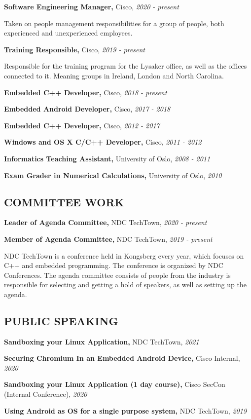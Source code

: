 \documentclass{article}
\newcommand\CVEntry[3]{
  {\bf #1,} #2, {\it #3}
}
\newcommand\CVComment[4]{
  \CVEntry{#1}{#2}{#3}

  #4
}
\begin{document}
\begin{addmargin}[2em]{0em}
  \CVComment{Software Engineering Manager}{Cisco}{2020 - present}{
    Taken on people management responsibilities for a group of people, both experienced and 
    unexperienced employees.}

  \CVComment{Training Responsible}{Cisco}{2019 - present}{
    Responsible for the training program for the Lysaker office, as well as the offices connected to
    it. Meaning groups in Ireland, London and North Carolina.}

  \CVEntry{Embedded C++ Developer}{Cisco}{2018 - present}

  \CVEntry{Embedded Android Developer}{Cisco}{2017 - 2018}

  \CVEntry{Embedded C++ Developer}{Cisco}{2012 - 2017}

  \CVEntry{Windows and OS X C/C++ Developer}{Cisco}{2011 - 2012}

  \CVEntry{Informatics Teaching Assistant}{University of Oslo}{2008 - 2011}

  \CVEntry{Exam Grader in Numerical Calculations}{University of Oslo}{2010}

\end{addmargin}

\subsection*{COMMITTEE WORK}

\begin{addmargin}[2em]{0em}
  \CVEntry{Leader of Agenda Committee}{NDC TechTown}{2020 - present}

  \CVComment{Member of Agenda Committee}{NDC TechTown}{2019 - present}{
    NDC TechTown is a conference held in Kongsberg every year, which focuses on C++
    and embedded programming. The conference is organized by NDC Conferences. The
    agenda committee consists of people from the industry is responsible for
    selecting and getting a hold of speakers, as well as setting up the agenda.}

\end{addmargin}

\subsection*{PUBLIC SPEAKING}

\begin{addmargin}[2em]{0em}
  \CVEntry{Sandboxing your Linux Application}{NDC TechTown}{2021}

  \CVEntry{Securing Chromium In an Embedded Android Device}{Cisco Internal}{2020}

  \CVEntry{Sandboxing your Linux Application (1 day course)}{Cisco SecCon (Internal Conference)}{2020}

  \CVEntry{Using Android as OS for a single purpose system}{NDC TechTown}{2019}
\end{addmargin}
\end{document}
